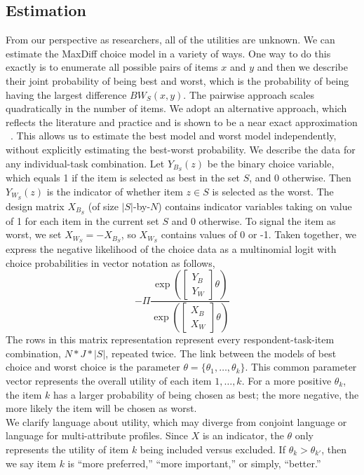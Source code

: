 \documentclass[nonblindrev]{informs3}
\begin{document}
\subsection{Estimation}
From our perspective as researchers, all of the utilities are unknown. We can estimate the MaxDiff choice model in a variety of ways. One way to do this exactly is to enumerate all possible pairs of items $x$ and $y$ and then we describe their joint probability of being best and worst, which is the probability of being having the largest difference $BW_S(x,y)$. The pairwise approach scales quadratically in the number of items. We adopt an alternative approach, which reflects the literature and practice and is shown to be a near exact approximation ~\cite{cohen2003maximum}. This allows us to estimate the best model and worst model independently, without explicitly estimating the best-worst probability. 
We describe the data for any individual-task combination. Let $Y_{B_S}(z)$ be the binary choice variable, which equals 1 if the item is selected as best in the set $S$, and 0 otherwise. Then $Y_{W_S}(z)$ is the indicator of whether item $z \in S$ is selected as the worst. The design matrix $X_{B_S}$ (of size $|S|$-by-$N$) contains indicator variables taking on value of 1 for each item in the current set $S$ and 0 otherwise. To signal the item as worst, we set $X_{W_S}=-X_{B_S}$, so $X_{W_S}$ contains values of 0 or -1.  Taken together, we express the negative likelihood of the choice data as a multinomial logit with choice probabilities in vector notation as follows,
\[
-\Pi\frac{\exp{(\begin{bmatrix}Y_B\\Y_W\end{bmatrix}\theta)}}{\exp{(\begin{bmatrix}X_B\\X_W\end{bmatrix}\theta)}}
\]
The rows in this matrix representation represent every respondent-task-item combination, $N*J*|S|$, repeated twice.  
The link between the models of best choice and worst choice is the parameter $\theta=\{\theta_1,\ldots,\theta_k \}$. This common parameter vector represents the overall utility of each item $1,\ldots,k$. For a more positive $\theta_k$, the item $k$ has a larger probability of being chosen as best; the more negative, the more likely the item will be chosen as worst.\\
We clarify language about utility, which may diverge from conjoint language or language for multi-attribute profiles. Since $X$ is an indicator, the $\theta$ only represents the utility of item $k$ being included versus excluded. If $\theta_k > \theta_{k'}$, then we say item $k$ is ``more preferred,'' ``more important,'' or simply, ``better.''\\
\end{document}
